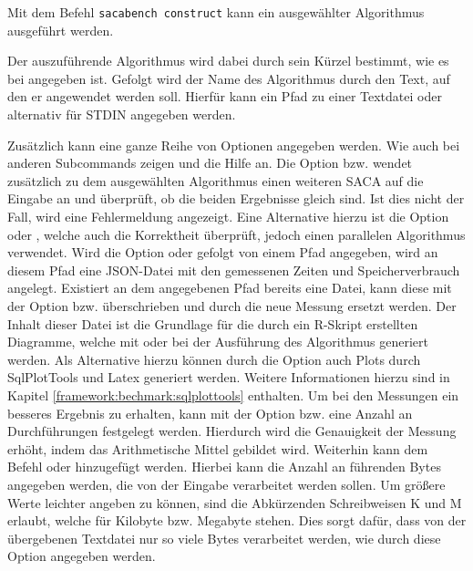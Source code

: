 {Mit dem Befehl \texttt{sacabench construct} kann ein ausgewählter Algorithmus ausgeführt werden. 
\par
Der auszuf{\"u}hrende Algorithmus wird dabei durch sein K{\"u}rzel bestimmt, wie es bei  angegeben ist. 
Gefolgt wird der Name des Algorithmus durch den Text, auf den er angewendet werden soll. 
Hierf{\"u}r kann ein Pfad zu einer Textdatei oder alternativ \termfont{-} f{\"u}r STDIN angegeben werden. 
\par
Zus{\"a}tzlich kann eine ganze Reihe von Optionen angegeben werden. 
Wie auch bei anderen Subcommands zeigen  und  die Hilfe an. 
Die Option  bzw.  wendet zus{\"a}tzlich zu dem ausgew{\"a}hlten Algorithmus einen weiteren SACA auf die Eingabe an und {\"u}berpr{\"u}ft, ob die beiden Ergebnisse gleich sind. 
Ist dies nicht der Fall, wird eine Fehlermeldung angezeigt. 
Eine Alternative hierzu ist die Option  oder , welche auch die Korrektheit überprüft, jedoch einen parallelen Algorithmus verwendet. 
Wird die Option  oder  gefolgt von einem Pfad angegeben, wird an diesem Pfad eine JSON-Datei mit den gemessenen Zeiten und Speicherverbrauch angelegt. 
Existiert an dem angegebenen Pfad bereits eine Datei, kann diese mit der Option  bzw.  {\"u}berschrieben und durch die neue Messung ersetzt werden. 
Der Inhalt dieser Datei ist die Grundlage f{\"u}r die durch ein R-Skript erstellten Diagramme, welche mit  oder  bei der Ausf{\"u}hrung des Algorithmus generiert werden. 
Als Alternative hierzu können durch die Option  auch Plots durch SqlPlotTools und Latex generiert werden.
Weitere Informationen hierzu sind in Kapitel \ref{framework:bechmark:sqlplottools} enthalten.
Um bei den Messungen ein besseres Ergebnis zu erhalten, kann mit der Option  bzw.  eine Anzahl an Durchf{\"u}hrungen festgelegt werden. 
Hierdurch wird die Genauigkeit der Messung erh{\"o}ht, indem das Arithmetische Mittel gebildet wird.
Weiterhin kann dem Befehl  oder  hinzugef{\"u}gt werden. 
Hierbei kann die Anzahl an f{\"u}hrenden Bytes angegeben werden, die von der Eingabe verarbeitet werden sollen.
Um gr{\"o}{\ss}ere Werte leichter angeben zu k{\"o}nnen, sind die Abk{\"u}rzenden Schreibweisen K und M erlaubt, welche f{\"u}r Kilobyte bzw. Megabyte stehen.
Dies sorgt daf{\"u}r, dass von der {\"u}bergebenen Textdatei nur so viele Bytes verarbeitet werden, wie durch diese Option angegeben werden. 
}
